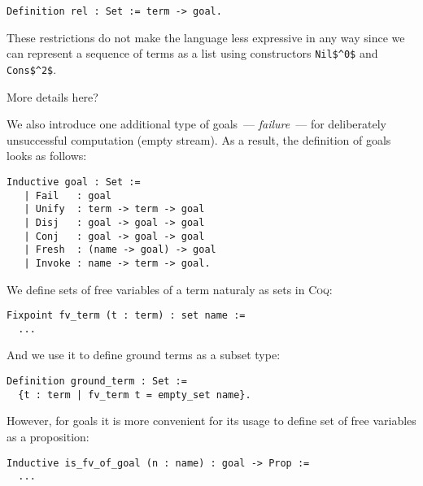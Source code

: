\begin{lstlisting}[language=Coq,basicstyle=\footnotesize]
   Definition rel : Set := term -> goal.
\end{lstlisting}

These restrictions do not make the language less expressive in any way since we can represent a sequence of terms as a list using constructors \lstinline|Nil$^0$| and \lstinline|Cons$^2$|.

{ \color{red} More details here? }

We also introduce one additional type of goals~--- \emph{failure}~--- for deliberately unsuccessful computation (empty stream). As a result, the definition of goals looks as follows:

\begin{lstlisting}[language=Coq,basicstyle=\footnotesize]
   Inductive goal : Set :=
   | Fail   : goal
   | Unify  : term -> term -> goal
   | Disj   : goal -> goal -> goal
   | Conj   : goal -> goal -> goal
   | Fresh  : (name -> goal) -> goal
   | Invoke : name -> term -> goal.
\end{lstlisting}

{ \color{blue} We define sets of free variables of a term naturaly as sets in \textsc{Coq}:

\begin{lstlisting}[language=Coq,basicstyle=\footnotesize]
Fixpoint fv_term (t : term) : set name :=
  ...
\end{lstlisting}

And we use it to define ground terms as a subset type:

\begin{lstlisting}[language=Coq,basicstyle=\footnotesize]
Definition ground_term : Set :=
  {t : term | fv_term t = empty_set name}.
\end{lstlisting}

However, for goals it is more convenient for its usage to define set of free variables as a proposition:

\begin{lstlisting}[language=Coq,basicstyle=\footnotesize]
Inductive is_fv_of_goal (n : name) : goal -> Prop :=
  ...
\end{lstlisting}
 }

